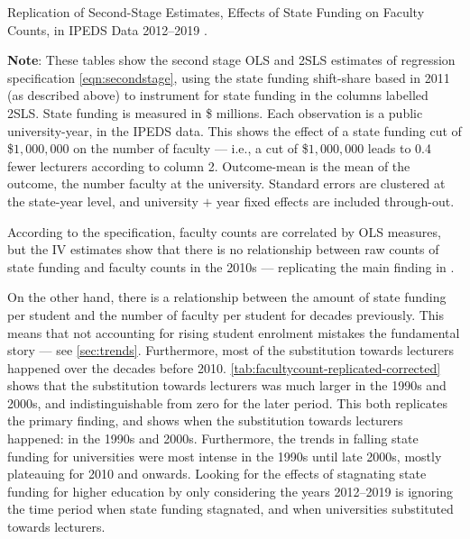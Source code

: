 \begin{table}[H]
    \singlespacing
    \centering
    \caption{Replication of Second-Stage Estimates, Effects of State Funding on Faculty Counts, in IPEDS Data 2012--2019 \citep{hinrichs2022state}.}
    \makebox[\textwidth][c]{}
    \label{tab:facultycount-replicate}
    \justify
    \footnotesize
    \textbf{Note}:
    These tables show the second stage OLS and 2SLS estimates of regression specification \eqref{eqn:secondstage}, using the state funding shift-share based in 2011 (as described above) to instrument for state funding in the columns labelled 2SLS.
    State funding is measured in \$ millions.
    Each observation is a public university-year, in the IPEDS data.
    This shows the effect of a state funding cut of \$$1,000,000$ on the number of faculty --- i.e.,
    a cut of \$$1,000,000$ leads to 0.4 fewer lecturers according to column 2.
    Outcome-mean is the mean of the outcome, the number faculty at the university.
    Standard errors are clustered at the state-year level, and university $+$ year fixed effects are included through-out.
\end{table}

According to the \cite{hinrichs2022state} specification, faculty counts are correlated by OLS measures, but the IV estimates show that there is no relationship between raw counts of state funding and faculty counts in the 2010s --- replicating the main finding in \cite{hinrichs2022state}.

On the other hand, there is a relationship between the amount of state funding per student and the number of faculty per student for decades previously.
This means that not accounting for rising student enrolment mistakes the fundamental story --- see \autoref{sec:trends}.
Furthermore, most of the substitution towards lecturers happened over the decades before 2010.
\autoref{tab:facultycount-replicated-corrected} shows that the substitution towards lecturers was much larger in the 1990s and 2000s, and indistinguishable from zero for the later period.
This both replicates the primary \cite{hinrichs2022state} finding, and shows when the substitution towards lecturers happened: in the 1990s and 2000s.
Furthermore, the trends in falling state funding for universities were most intense in the 1990s until late 2000s, mostly plateauing for 2010 and onwards.
Looking for the effects of stagnating state funding for higher education by only considering the years 2012--2019 is ignoring the time period when state funding stagnated, and when universities substituted towards lecturers.
